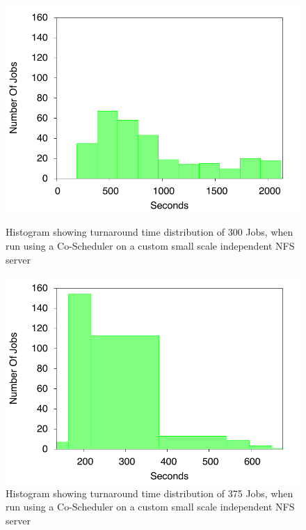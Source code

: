 \documentclass[ms,electronic,double]{nuthesis}
\begin{document}
\begin{figure}[htbp!]
\begin{center}
\includegraphics{images/nfs_tusker_histogram}
\caption{Histogram showing turnaround time distribution of 300 Jobs, when run using a Co-Scheduler on a custom small scale independent NFS server}
\label{fig:nfs_tusker_histogram}
\end{center}

\begin{center}
\includegraphics{images/nfs_coscheduler_tusker_histogram}
\caption{Histogram showing turnaround time distribution of 375 Jobs, when run using a Co-Scheduler on a custom small scale independent NFS server}
\label{fig:nfs_coscheduler_tusker_histogram}
\end{center}


\end{figure}
\FloatBarrier
\end{document}
